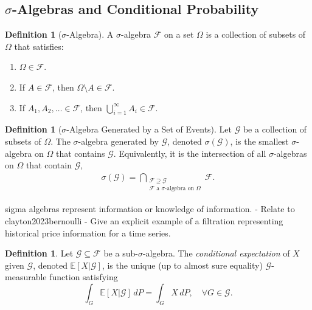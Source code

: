 \documentclass[11pt,reqno]{amsart}
\theoremstyle{definition}
\newtheorem{definition}[theorem]{Definition}
\theoremstyle{remark}
\begin{document}
\subsection{\(\sigma\)-Algebras and Conditional Probability}

\begin{definition}[\(\sigma\)-Algebra]
	A \(\sigma\)-algebra \(\mathcal{F}\) on a set \(\Omega\) is a collection of subsets of \(\Omega\) that satisfies:
	\begin{enumerate}[label=(\roman*)]
		\item \(\Omega \in \mathcal{F}\).
		\item If \(A \in \mathcal{F}\), then \(\Omega \setminus A \in \mathcal{F}\).
		\item If \(A_1, A_2, \ldots \in \mathcal{F}\), then \(\bigcup_{i=1}^\infty A_i \in \mathcal{F}\).
	\end{enumerate}
\end{definition}

\begin{definition}[\(\sigma\)-Algebra Generated by a Set of Events]
	Let \(\mathcal{G}\) be a collection of subsets of \(\Omega\).
	The \(\sigma\)-algebra generated by \(\mathcal{G}\), denoted \(\sigma(\mathcal{G})\), is the smallest \(\sigma\)-algebra on \(\Omega\) that contains \(\mathcal{G}\).
	Equivalently, it is the intersection of all \(\sigma\)-algebras on \(\Omega\) that contain \(\mathcal{G}\),
	\begin{align*}
		\sigma(\mathcal{G}) = \bigcap_{\substack{\mathcal{F} \supseteq \mathcal{G} \\\mathcal{F}\text{ a }\sigma\text{-algebra} \text{ on }\Omega}} \mathcal{F}.
	\end{align*}
\end{definition}

sigma algebras represent information or knowledge of information.
- Relate to clayton2023bernoulli
- Give an explicit example of a filtration representing historical price information for a time series.

\begin{definition}
	Let $\mathcal{G} \subseteq \mathcal{F}$ be a sub-$\sigma$-algebra. The \emph{conditional expectation} of $X$ given $\mathcal{G}$, denoted $\mathbb{E}[X|\mathcal{G}]$, is the unique (up to almost sure equality) $\mathcal{G}$-measurable function satisfying
	\[
		\int_G \mathbb{E}[X|\mathcal{G}] \, dP = \int_G X \, dP, \quad \forall G \in \mathcal{G}.
	\]
\end{definition}
\end{document}
